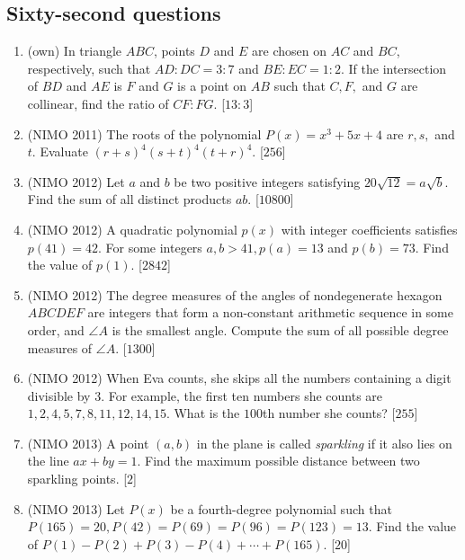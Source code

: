 \documentclass[11pt,paper=letter]{scrartcl}
\begin{document}
\subsection{Sixty-second questions}

\begin{enumerate}

\item (own) In triangle $ABC$, points $D$ and $E$ are chosen on $AC$ and $BC$, respectively, such that $AD : DC = 3 : 7$ and $BE : EC = 1 : 2$. If the intersection of $BD$ and $AE$ is $F$ and $G$ is a point on $AB$ such that $C, F,$ and $G$ are collinear, find the ratio of $CF : FG$. \hfill [$13 : 3$]

\item (NIMO 2011) The roots of the polynomial $P(x) = x^3 + 5x + 4$ are $r, s,$ and $t$. Evaluate $(r+s)^4(s+t)^4(t+r)^4$. \hfill [$256$]

\item (NIMO 2012) Let $a$ and $b$ be two positive integers satisfying $20\sqrt{12} = a\sqrt{b}$. Find the sum of all distinct products $ab$. \hfill [$10800$]

\item (NIMO 2012) A quadratic polynomial $p(x)$ with integer coefficients satisfies $p(41) = 42$. For some integers $a, b > 41, p(a) = 13$ and $p(b) = 73$. Find the value of $p(1)$. \hfill [$2842$]

\item (NIMO 2012) The degree measures of the angles of nondegenerate hexagon $ABCDEF$ are integers that form a non-constant arithmetic sequence in some order, and $\angle A$ is the smallest angle. Compute the sum of all possible degree measures of $\angle A$. \hfill [$1300$]

\item (NIMO 2012) When Eva counts, she skips all the numbers containing a digit divisible by 3. For example, the first ten numbers she counts are $1, 2, 4, 5, 7, 8, 11, 12, 14, 15$. What is the $100$th number she counts? \hfill [$255$]

\item (NIMO 2013) A point $(a, b)$ in the plane is called \emph{sparkling} if it also lies on the line $ax + by = 1$. Find the maximum possible distance between two sparkling points. \hfill [$2$]

\item (NIMO 2013) Let $P(x)$ be a fourth-degree polynomial such that $P(165) = 20, P(42) = P(69) = P(96) = P(123) = 13$. Find the value of $P(1) - P(2) + P(3) - P(4) + \cdots + P(165)$. \hfill [$20$]


\end{enumerate}
\end{document}
